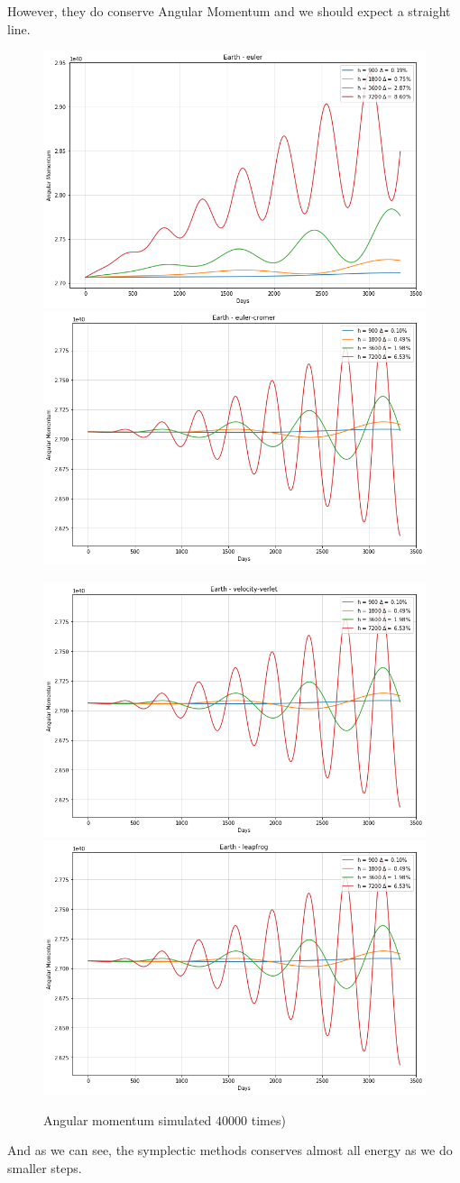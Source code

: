 \documentclass[12pt]{article}
\begin{document}
However, they do conserve Angular Momentum and we should expect a straight line.
\begin{figure}[H]
  \includegraphics[width=.52\textwidth, height =.4\textheight]{earth-m-euler.png}
  \includegraphics[width=.52\textwidth, height =.4\textheight]{earth-m-eulercromer.png}

  \includegraphics[width=.52\textwidth, height =.4\textheight]{earth-m-verlet.png}
  \includegraphics[width=.52\textwidth, height =.4\textheight]{earth-m-leapfrog.png}
  \caption{Angular momentum simulated \(40000\) times)}
  \label{Euler Method}
\end{figure}
And as we can see, the symplectic methods conserves almost all energy as we do smaller steps.
\end{document}
